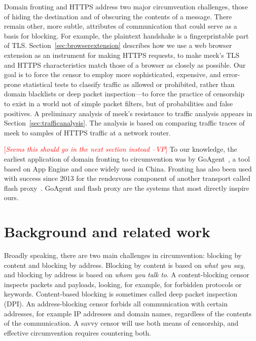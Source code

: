 \documentclass{sig-alternate}
\newcommand{\meek}{meek\xspace}
\newcommand{\note}[1]{{\textcolor{red}{[\textit{#1}]}}}
\newcommand{\vp}[1]{\note{#1 --VP}}
\begin{document}

Domain fronting and HTTPS address two major circumvention challenges,
those of hiding the destination and of obscuring the contents of a message.
There remain other, more subtle, attributes of communication
that could serve as a basis for blocking.
For example, the plaintext handshake is a fingerprintable part of TLS.
Section~\ref{sec:browserextension} describes how we use a web browser extension as an instrument for making HTTPS requests,
to make \meek's TLS and HTTPS characteristics
match those of a browser as closely as possible.
Our goal is to force the censor
to employ more sophisticated, expensive, and error-prone statistical tests
to classify traffic as allowed or prohibited,
rather than domain blacklists or deep packet inspection---to
force the practice of censorship to exist in a world
not of simple packet filters,
but of probabilities and false positives.
A preliminary analysis of \meek's resistance to traffic analysis
appears in Section~\ref{sec:trafficanalysis}.
The analysis is based on comparing traffic traces of \meek
to samples of HTTPS traffic at a network router.

\vp{Seems this should go in the next section instead}
To our knowledge,
the earliest application of domain fronting to circumvention
was by GoAgent~\cite{goagent},
a tool based on App Engine and
once widely used in China.
Fronting has also been used with success since 2013
for the rendezvous component of another transport called flash proxy~\cite{flashproxy}.
GoAgent and flash proxy are the systems that most directly
inspire ours.


\section{Background and related work}
\label{sec:related-work}

Broadly speaking, there are two main challenges in circumvention:
blocking by content and blocking by address.
Blocking by content is based on \emph{what you say},
and blocking by address is based on \emph{whom you talk to}.
A content-blocking censor inspects packets and payloads,
looking, for example, for forbidden protocols or keywords.
Content-based blocking is sometimes called deep packet inspection (DPI).
An address-blocking censor forbids all communication with certain
addresses, for example IP addresses and domain names, regardless of
the contents of the communication.
A savvy censor will use both means of censorship, and
effective circumvention requires countering both.
\end{document}
